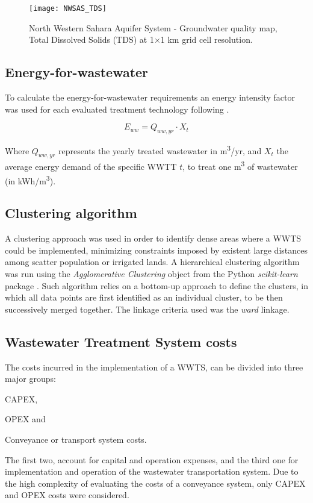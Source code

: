 \begin{figure}[!ht]
	\centering
	\texttt{[image: NWSAS\_TDS]}
	\caption[NWSAS groundwater quality map - Total Dissolved Solids (TDS)]{North Western Sahara Aquifer System - Groundwater quality map, Total Dissolved Solids (TDS) at 1$\times$1 km grid cell resolution.}
	\label{fig:TDS}
\end{figure}

\subsection{Energy-for-wastewater}\label{Sc:eww}
To calculate the energy-for-wastewater requirements an energy intensity factor was used for each evaluated treatment technology following .

\begin{equation}\label{eq:energy-for-wastewater}
E_{ww} = Q_{ww,yr}\cdot X_t
\end{equation}

Where $Q_{ww,yr}$ represents the yearly treated wastewater in m\textsuperscript{3}/yr, and $X_t$ the average energy demand of the specific WWTT $t$, to treat one m\textsuperscript{3} of wastewater (in kWh/m\textsuperscript{3}).

\subsection{Clustering algorithm}\label{Sc:clustering}
A clustering approach was used in order to identify dense areas where a WWTS could be implemented, minimizing constraints imposed by existent large distances among scatter population or irrigated lands. A hierarchical clustering  algorithm was run using the \textit{Agglomerative Clustering} object from the Python \textit{scikit-learn} package \cite{scikit-learn}. Such algorithm relies on a bottom-up approach to define the clusters, in which all data points are first identified as an individual cluster, to be then successively merged together. The linkage criteria used was the \textit{ward} linkage.

\subsection{Wastewater Treatment System costs}
The costs incurred in the implementation of a WWTS, can be divided into three major groups: \begin{enumerate*}[label=\upshape(\arabic*\upshape)]
	\item CAPEX, \item OPEX and \item Conveyance or transport system costs.
\end{enumerate*} The first two, account for capital and operation expenses, and the third one for implementation and operation of the wastewater transportation system. Due to the high complexity of evaluating the costs of a conveyance system, only CAPEX and OPEX costs were considered.

